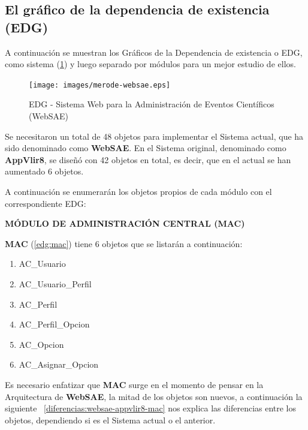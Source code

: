 \subsection{El gr\'afico de la dependencia de existencia (EDG)}
\begin{indentar}
A continuaci\'on se muestran los Gr\'aficos de la Dependencia de existencia o EDG, como sistema (\ref{edg:websae}) y luego separado por m\'odulos para un mejor estudio de ellos.

\begin{landscape}
\begin{figure}
  \centering
    {\texttt{[image: images/merode-websae.eps]}}
  \caption{EDG - Sistema Web para la Administraci\'on de Eventos Cient\'ificos (WebSAE)}
  \label{edg:websae}
\end{figure}
\end{landscape}

Se necesitaron un total de 48 objetos para implementar el Sistema actual, que ha sido denominado como \textbf{WebSAE}. En el Sistema original, denominado como \textbf{AppVlir8}, se dise\~n\'o con 42 objetos en total, es decir, que en el actual se han aumentado 6 objetos.

A continuaci\'on se enumerar\'an los objetos propios de cada m\'odulo con el correspondiente EDG:

\textbf{M\'ODULO DE ADMINISTRACI\'ON CENTRAL (MAC)}

\textbf{MAC} (\ref{edg:mac}) tiene 6 objetos que se listar\'an a continuaci\'on:

\begin{enumerate}
\item AC\_Usuario
\item AC\_Usuario\_Perfil
\item AC\_Perfil
\item AC\_Perfil\_Opcion
\item AC\_Opcion
\item AC\_Asignar\_Opcion
\end{enumerate}

Es necesario enfatizar que \textbf{MAC} surge en el momento de pensar en la Arquitectura de \textbf{WebSAE}, la mitad  de los objetos son nuevos, a continuaci\'on la siguiente ~\ref{diferencias:websae-appvlir8-mac} nos explica las diferencias entre los objetos, dependiendo si es el Sistema actual o el anterior.


\end{indentar}
